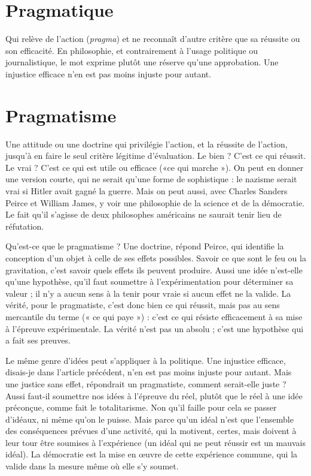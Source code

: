 \section{Pragmatique}
Qui relève de l’action ({\it pragma}) et ne reconnaît d’autre
critère que sa réussite ou son efficacité. En philosophie,
et contrairement à l’usage politique ou journalistique, le mot exprime plutôt
une réserve qu’une approbation. Une injustice efficace n’en est pas moins
injuste pour autant.

\section{Pragmatisme}
Une attitude ou une doctrine qui privilégie l’action, et la
réussite de l’action, jusqu’à en faire le seul critère légitime
d'évaluation. Le bien ? C’est ce qui réussit. Le vrai ? C’est ce qui est utile ou
efficace («ce qui marche »). On peut en donner une version courte, qui ne
serait qu’une forme de sophistique : le nazisme serait vrai si Hitler avait gagné
la guerre. Mais on peut aussi, avec Charles Sanders Peirce et William James, y
voir une philosophie de la science et de la démocratie. Le fait qu’il s'agisse de
deux philosophes américains ne saurait tenir lieu de réfutation.

Qu'est-ce que le pragmatisme ? Une doctrine, répond Peirce, qui identifie
la conception d’un objet à celle de ses effets possibles. Savoir ce que sont le feu
ou la gravitation, c’est savoir quels effets ils peuvent produire. Aussi une idée
n'est-elle qu’une hypothèse, qu’il faut soumettre à l'expérimentation pour
déterminer sa valeur ; il n’y a aucun sens à la tenir pour vraie si aucun effet ne
la valide. La vérité, pour le pragmatiste, c’est donc bien ce qui réussit, mais pas
au sens mercantile du terme (« ce qui paye ») : c’est ce qui résiste efficacement
à sa mise à l'épreuve expérimentale. La vérité n’est pas un absolu ; c'est une
hypothèse qui a fait ses preuves.

Le même genre d’idées peut s'appliquer à la politique. Une injustice efficace,
disais-je dans l’article précédent, n’en est pas moins injuste pour autant.
Mais une justice sans effet, répondrait un pragmatiste, comment serait-elle
juste ? Aussi faut-il soumettre nos idées à l’épreuve du réel, plutôt que le réel à
une idée préconçue, comme fait le totalitarisme. Non qu’il faille pour cela se
passer d’idéaux, ni même qu’on le puisse. Mais parce qu’un idéal n’est que
l’ensemble des conséquences prévues d’une activité, qui la motivent, certes,
mais doivent à leur tour être soumises à l’expérience (un idéal qui ne peut
réussir est un mauvais idéal). La démocratie est la mise en œuvre de cette expérience
commune, qui la valide dans la mesure même où elle s’y soumet.

